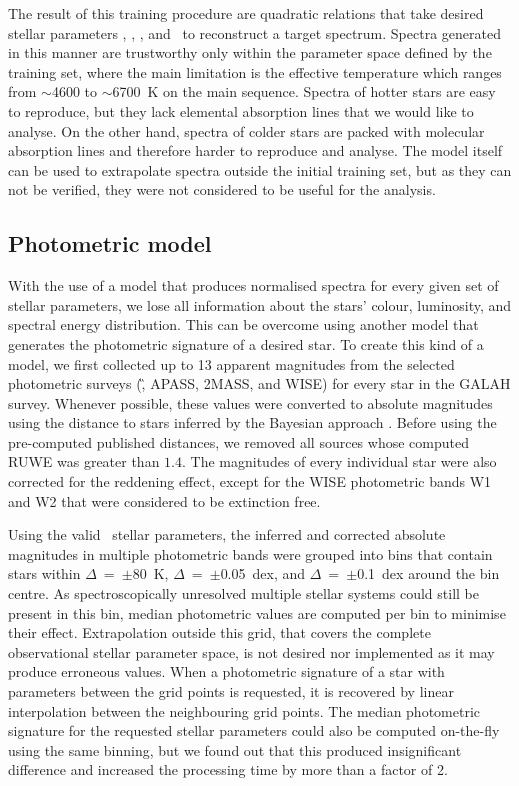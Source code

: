 The result of this training procedure are quadratic relations that take desired stellar parameters \Teff, \Logg, \Feh, and \vsin\ to reconstruct a target spectrum. Spectra generated in this manner are trustworthy only within the parameter space defined by the training set, where the main limitation is the effective temperature which ranges from $\sim$4600 to $\sim$6700~K on the main sequence. Spectra of hotter stars are easy to reproduce, but they lack elemental absorption lines that we would like to analyse. On the other hand, spectra of colder stars are packed with molecular absorption lines and therefore harder to reproduce and analyse. The model itself can be used to extrapolate spectra outside the initial training set, but as they can not be verified, they were not considered to be useful for the analysis.

\subsection{Photometric model}
\label{sec:p_model}
With the use of a model that produces normalised spectra for every given set of stellar parameters, we lose all information about the stars' colour, luminosity, and spectral energy distribution. This can be overcome using another model that generates the photometric signature of a desired star. To create this kind of a model, we first collected up to 13 apparent magnitudes from the selected photometric surveys (\G, APASS, 2MASS, and WISE) for every star in the GALAH survey. Whenever possible, these values were converted to absolute magnitudes using the distance to stars inferred by the Bayesian approach \cite{2018AJ....156...58B}. Before using the pre-computed published distances, we removed all sources whose computed RUWE was greater than $1.4$. The magnitudes of every individual star were also corrected for the reddening effect, except for the WISE photometric bands W1 and W2 that were considered to be extinction free.

Using the valid \TC\ stellar parameters, the inferred and corrected absolute magnitudes in multiple photometric bands were grouped into bins that contain stars within $\Delta$\Teff~=~$\pm$80~K, $\Delta$\Logg~=~$\pm$0.05~dex, and $\Delta$\Feh~=~$\pm$0.1~dex around the bin centre. As spectroscopically unresolved multiple stellar systems could still be present in this bin, median photometric values are computed per bin to minimise their effect. Extrapolation outside this grid, that covers the complete observational stellar parameter space, is not desired nor implemented as it may produce erroneous values. When a photometric signature of a star with parameters between the grid points is requested, it is recovered by linear interpolation between the neighbouring grid points. The median photometric signature for the requested stellar parameters could also be computed on-the-fly using the same binning, but we found out that this produced insignificant difference and increased the processing time by more than a factor of 2.

